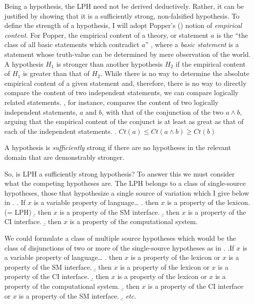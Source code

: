 Being a hypothesis, the LPH need not be derived deductively.
Rather, it can be justified by showing that it is a sufficiently strong, non-falsified hypothesis.
To define the strength of a hypothesis, I will adopt Popper's (\citeyear{popper1959logic,popper2014conjectures}) notion of \textit{empirical content}.
For Popper, the empirical content of a theory, or statement $a$ is the ``the class of all basic statements which contradict $a$'' \parencite[315]{popper2014conjectures}, where a \textit{basic statement} is a statement whose truth-value can be determined by mere observation of the world.
A hypothesis $H_1$ is stronger than another hypothesis $H_2$ if the empirical content of $H_1$ is greater than that of $H_2$.
While there is no way to determine the absolute empirical content of a given statement and, therefore, there is no way to directly compare the content of two independent statements, we can compare logically related statements.
\textcite[295]{popper2014conjectures}, for instance, compares the content of two logically independent statements, $a$ and $b$, with that of the conjunction of the two $a\wedge b$, arguing that the empirical content of the conjunct is at least as great as that of each of the independent statements.
\ex. $Ct(a) \leq Ct(a\wedge b) \geq Ct(b)$

A hypothesis is \textit{sufficiently} strong if there are no hypotheses in the relevant domain that are demonstrably stronger.

So, is LPH a sufficiently strong hypothesis?
To answer this we must consider what the competing hypotheses are.
The LPH belongs to a class of single-source hypotheses, those that hypothesize a single source of variation which I give below in \Next.
\ex. If $x$ is a variable property of language\ldots
\a. then $x$ is a property of the lexicon. (= LPH)
\b. then $x$ is a property of the SM interface.
\b. then $x$ is a property of the CI interface.
\b. then $x$ is a property of the computational system.

We could formulate a class of multiple source hypotheses which would be the class of disjunctions of two or more of the single-source hypotheses as in \Next.
\ex.If $x$ is a variable property of language\ldots
\a. then $x$ is a property of the lexicon or $x$ is a property of the SM interface.
\b. then $x$ is a property of the lexicon or $x$ is a property of the CI interface. 
\b. then $x$ is a property of the lexicon or $x$ is a property of the computational system. 
\b. then $x$ is a property of the CI interface or $x$ is a property of the SM interface.
\b. \textit{etc.} 

